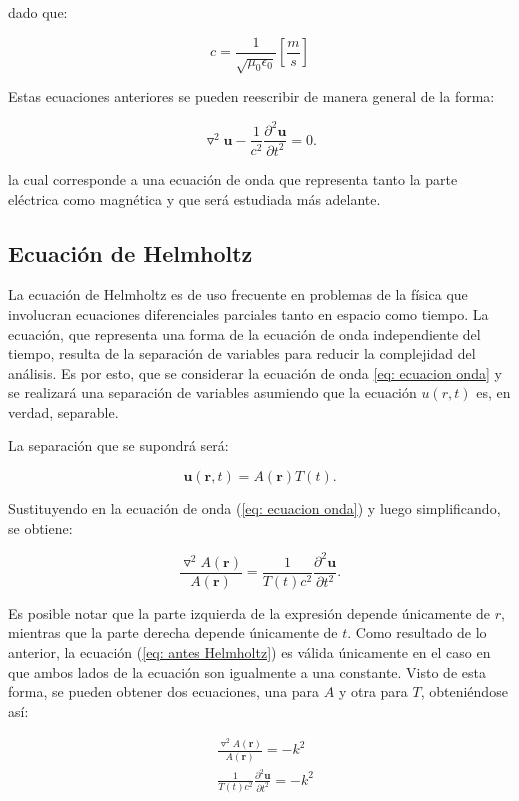 \documentclass[12pt,letterpaper]{article}
\numberwithin{equation}{section}
\begin{document}
\noindent dado que:

$$c = \frac{1}{\sqrt{\mu_0\epsilon_0}} \left[\frac{m}{s}\right]$$

\noindent Estas ecuaciones anteriores se pueden reescribir de manera general de la forma:

\begin{equation}
\triangledown^2\textbf{u} - \frac{1}{c^2}\frac{\partial^2\textbf{u}}{\partial t^2}= 0.
\label{eq: ecuacion onda}
\end{equation} 

\noindent la cual corresponde a una ecuación de onda que representa tanto la parte eléctrica como magnética y que será estudiada más adelante. 


\subsection{Ecuación de Helmholtz}

La ecuación de Helmholtz es de uso frecuente en problemas de la física que involucran ecuaciones diferenciales parciales tanto en espacio como tiempo. La ecuación, que representa una forma de la ecuación de onda independiente del tiempo, resulta de la separación de variables para reducir la complejidad del análisis. Es por esto, que se considerar la ecuación de onda \ref{eq: ecuacion onda} y se realizará una separación de variables asumiendo que la ecuación $u(r,t)$ es, en verdad, separable.

\noindent La separación que se supondrá será:


$$\textbf{u}(\textbf{r},t)=A(\textbf{r})T(t).$$

\noindent Sustituyendo en la ecuación de onda (\ref{eq: ecuacion onda}) y luego simplificando, se obtiene:

\begin{equation}
\frac{\triangledown^2A(\textbf{r})}{A(\textbf{r})} = \frac{1}{T(t)c^2}\frac{\partial^2\textbf{u}}{\partial t^2}.
\label{eq: antes Helmholtz}
\end{equation}

Es posible notar que la parte izquierda de la expresión depende únicamente de $r$, mientras que la parte derecha depende únicamente de $t$. Como resultado de lo anterior, la ecuación (\ref{eq: antes Helmholtz}) es válida únicamente en el caso en que ambos lados de la ecuación son igualmente a una constante. Visto de esta forma, se pueden obtener dos ecuaciones, una para $A$ y otra para $T$, obteniéndose así:


\begin{equation*}
\begin{split}
&\frac{\triangledown^2A(\textbf{r})}{A(\textbf{r})} = -k^2\\
&\frac{1}{T(t)c^2}\frac{\partial^2\textbf{u}}{\partial t^2} = -k^2
\end{split}    
\end{equation*} 
\end{document}
